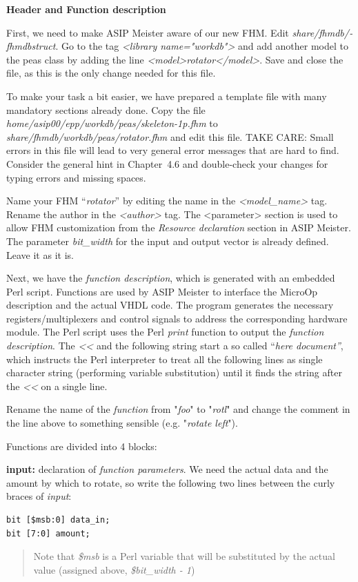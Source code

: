 \textbf{Header and Function description}

First, we need to make ASIP Meister aware of our new FHM. Edit
\emph{share/­fhmdb/­fhmdbstruct}. Go to the tag \emph{\textless library
name="workdb"\textgreater{}} and add another model to the peas class by
adding the line
\emph{\textless model\textgreater rotator\textless/model\textgreater{}}.
Save and close the file, as this is the only change needed for this
file.

To make your task a bit easier, we have prepared a template file with
many mandatory sections already done. Copy the file
\emph{home/asip00/epp/workdb/peas/skeleton-1p.fhm} to
\emph{share/fhmdb/workdb/peas/rotator.fhm} and edit this file. TAKE
CARE: Small errors in this file will lead to very general error messages
that are hard to find. Consider the general hint in Chapter~4.6 and
double-check your changes for typing errors and missing spaces.

Name your FHM ``\emph{rotator}'' by editing the name in the
\emph{\textless model\_name\textgreater{}} tag. Rename the author in the
\emph{\textless author\textgreater{}} tag. The
\textless parameter\textgreater{} section is used to allow FHM
customization from the \emph{Resource declaration} section in ASIP
Meister. The parameter \emph{bit\_width} for the input and output vector
is already defined. Leave it as it is.

Next, we have the \emph{function description}, which is generated with
an embedded Perl script. Functions are used by ASIP Meister to interface
the MicroOp description and the actual VHDL code. The program generates
the necessary registers/multiplexers and control signals to address the
corresponding hardware module. The Perl script uses the Perl
\emph{print} function to output the \emph{function description}. The 
\emph{\textless\textless{}} and the following string start a so called
``\emph{here document''}, which instructs the Perl interpreter to treat
all the following lines as single character string (performing variable
substitution) until it finds the string after the
\emph{\textless\textless{}} on a single line.

Rename the name of the \emph{function} from "\emph{foo}" to
"\emph{rotl}" and change the comment in the line above to something
sensible (e.g. "\emph{rotate left}").

Functions are divided into 4 blocks:

\textbf{input:} declaration of \emph{function parameters}. We need the
actual data and the amount by which to rotate, so write the following
two lines between the curly braces of \emph{input}:
\begin{lstlisting}
bit [$msb:0] data_in;
bit [7:0] amount;
\end{lstlisting}
\begin{quote}
Note that \emph{\$msb} is a Perl variable that will be substituted by
the actual value (assigned above, \emph{\$bit\_width - 1})
\end{quote}

